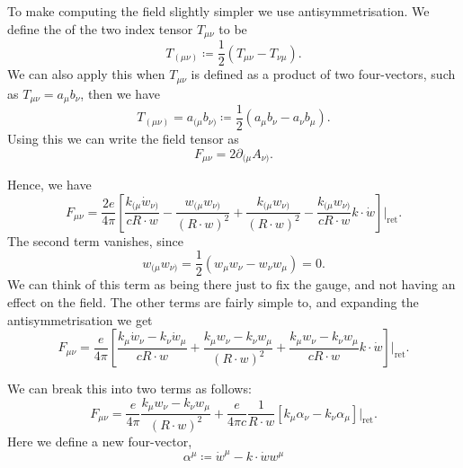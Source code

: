 \documentclass[fleqn]{NotesClass}
\newcommand*{\ret}{{\text{ret}}}
\begin{document}
    To make computing the field slightly simpler we use antisymmetrisation.
    We define the  of the two index tensor \(T_{\mu\nu}\) to be
    \begin{equation}
        T_{(\mu\nu)} \coloneqq \frac{1}{2}(T_{\mu\nu} - T_{\nu\mu}).
    \end{equation}
    We can also apply this when \(T_{\mu\nu}\) is defined as a product of two four-vectors, such as \(T_{\mu\nu} = a_\mu b_\nu\), then we have
    \begin{equation}
        T_{(\mu\nu)} = a_{(\mu}b_{\nu)} \coloneqq \frac{1}{2}(a_\mu b_\nu - a_\nu b_\mu).
    \end{equation}
    Using this we can write the field tensor as
    \begin{equation}
        F_{\mu\nu} = 2\partial_{(\mu} A_{\nu)}.
    \end{equation}
    
    Hence, we have
    \begin{equation}
        F_{\mu\nu} = \frac{2e}{4\pi} \left[ \frac{k_{(\mu}\dot{w}_{\nu)}}{c R\cdot w} - \frac{w_{(\mu}w_{\nu)}}{(R \cdot w)^2} + \frac{k_{(\mu}w_{\nu)}}{(R \cdot w)^2} - \frac{k_{(\mu}w_{\nu)}}{cR \cdot w} k \cdot \dot{w} \right] \bigg|_{\ret}.
    \end{equation}
    The second term vanishes, since
    \begin{equation}
        w_{(\mu}w_{\nu)} = \frac{1}{2}(w_\mu w_\nu - w_\nu w_\mu) = 0.
    \end{equation}
    We can think of this term as being there just to fix the gauge, and not having an effect on the field.
    The other terms are fairly simple to, and expanding the antisymmetrisation we get
    \begin{equation}
        F_{\mu\nu} = \frac{e}{4\pi} \left[ \frac{k_\mu\dot{w}_\nu - k_\nu\dot{w}_\mu}{c R \cdot w} + \frac{k_\mu w_\nu - k_\nu w_\mu}{(R \cdot w)^2} + \frac{k_\mu w_\nu - k_\nu w_\mu}{cR\cdot w} k\cdot \dot{w} \right] \bigg|_{\ret}.
    \end{equation}
    
    We can break this into two terms as follows:
    \begin{equation}
        F_{\mu\nu} = \frac{e}{4\pi} \frac{k_\mu w_\nu - k_\nu w_\mu}{(R \cdot w)^2} + \frac{e}{4\pi c} \frac{1}{R \cdot w}[k_\mu \alpha_\nu - k_\nu \alpha_\mu] \bigg|_{\ret}.
    \end{equation}
    Here we define a new four-vector,
    \begin{equation}
        \alpha^\mu \coloneqq \dot{w}^\mu - k \cdot \dot{w} w^\mu
    \end{equation}
    
\end{document}

